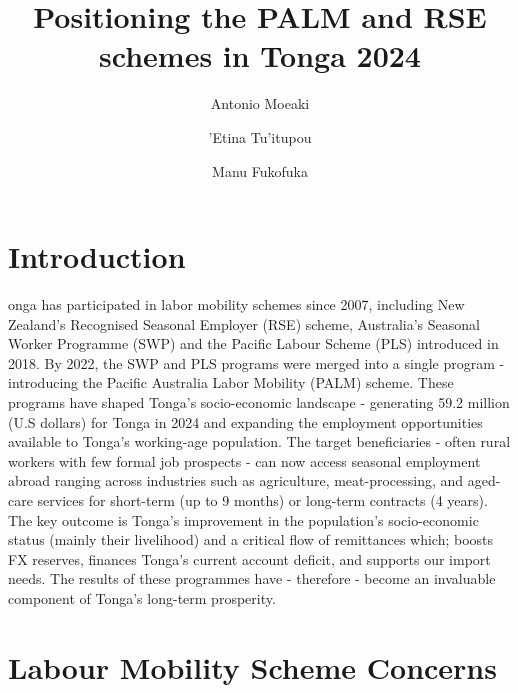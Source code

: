 \documentclass[9pt,a4paper,twocolumn,twoside]{tau-class/tau}
\title{Positioning the PALM and RSE schemes in Tonga 2024}
\author[a,1]{Antonio Moeaki}
\author[a,2]{'Etina Tu'itupou}
\author[a,3]{Manu Fukofuka}
\affil[a]{EFPD Economists}
\begin{document}
		
    \maketitle 
    \thispagestyle{firststyle} 
    \tauabstract 
     \tableofcontents
    

\section{Introduction}

    onga has participated in labor mobility schemes since 2007, including New Zealand's Recognised Seasonal Employer (RSE) scheme, Australia’s Seasonal Worker Programme (SWP) and the Pacific Labour Scheme (PLS) introduced in 2018. By 2022, the SWP and PLS programs were merged into a single program - introducing the Pacific Australia Labor Mobility (PALM) scheme. These programs have shaped Tonga's socio-economic landscape - generating 59.2 million (U.S dollars) for Tonga in 2024 and expanding the employment opportunities available to Tonga's working-age population. The target beneficiaries - often rural workers with few formal job prospects - can now access seasonal employment abroad ranging across industries such as agriculture, meat-processing, and aged-care services for short-term (up to 9 months) or long-term contracts (4 years). The key outcome is Tonga's  improvement in the population's socio-economic status (mainly their livelihood) and a critical flow of remittances which; boosts FX reserves, finances Tonga's current account deficit, and supports our import needs. The results of these programmes have - therefore - become an invaluable component of Tonga's long-term prosperity. %

    

\section{Labour Mobility Scheme Concerns}
\end{document}
